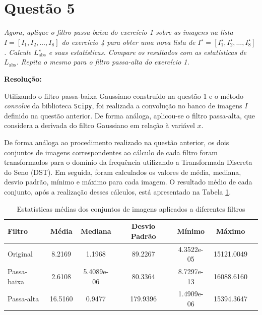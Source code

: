 \documentclass[a4paper, 11pt]{article}
\begin{document}
\section{Questão 5}

\textit{Agora, aplique o filtro passa-baixa do exercício 1 sobre as imagens na lista 
$I = [I_1, I_2, \ldots, I_8]$ do exercício 4 para obter uma nova lista de 
$I^{\star} = [I^{\star}_1, I^{\star}_2, \ldots, I^{\star}_8]$. 
Calcule $L^{\star}_{\text{abs}}$ e suas estatísticas. Compare os resultados 
com as estatísticas de $L_{\text{abs}}$. Repita o mesmo para o filtro 
passa-alta do exercício 1.
}

\textbf{Resolução:}

Utilizando o filtro passa-baixa Gaussiano construído na questão 1 e o método \textit{convolve} da biblioteca \texttt{Scipy}, foi realizada a convolução no banco de imagens \(I\) definido na questão anterior. De forma análoga, aplicou-se o filtro passa-alta, que considera a derivada do filtro Gaussiano em relação à variável \(x\).

De forma análoga ao procedimento realizado na questão anterior, os dois conjuntos de imagens correspondentes ao cálculo de cada filtro foram transformados para o domínio da frequência utilizando a Transformada Discreta do Seno (DST). Em seguida, foram calculados os valores de média, mediana, desvio padrão, mínimo e máximo para cada imagem. O resultado médio de cada conjunto, após a realização desses cálculos, está apresentado na Tabela \ref{tab:5}.

\begin{table}[h!]
    \centering
    \begin{tabular}{@{}lcccccc@{}}
        \toprule
        \textbf{Filtro} & \textbf{Média} & \textbf{Mediana} & \textbf{Desvio Padrão} & \textbf{Mínimo} & \textbf{Máximo} \\ 
        \midrule
        Original        & 8.2169         & 1.1968           & 89.2267                & 4.3522e-05      & 15121.0049       \\ 
        Passa-baixa     & 2.6108         & 5.4089e-06       & 80.3364                & 8.7297e-13      & 16088.6160       \\ 
        Passa-alta      & 16.5160         & 0.9477           & 179.9396                & 1.4909e-06      & 15394.3647        \\ 
        \bottomrule
    \end{tabular}
    \caption{Estatísticas médias dos conjuntos de imagens aplicados a diferentes filtros}
    \label{tab:5}
\end{table}
\end{document}
